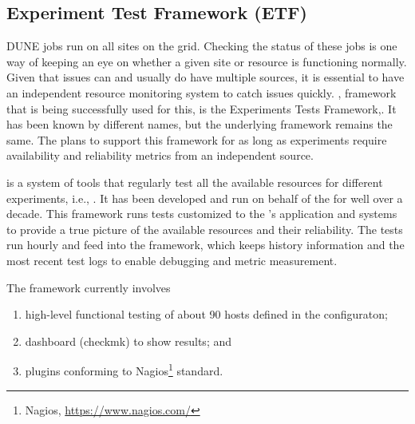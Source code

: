 \documentclass[../main-v1.tex]{subfiles}
\begin{document}
\subsection{Experiment Test Framework (ETF)}

DUNE jobs  run on all sites on the grid. Checking the status of these jobs is one way of keeping an eye on whether a given site or resource is functioning normally. Given that issues can and usually do have multiple sources, it is essential to have an independent resource monitoring system to %
catch issues quickly. %
, framework that is being successfully used for this, is the  %
 Experiments Tests Framework\cite{bib:ETFDoc},\cite{bib:ETFStatus}. It  has been known by different names, but the underlying framework remains the same. The  plans to support this framework for as long as  experiments require availability and reliability metrics from an independent source.
 
 is a system of tools that regularly test all the available resources for different experiments, i.e., . It has been developed and run on behalf of the  %
  for well over a decade. %
This framework runs tests customized to the 's application and systems to provide a true picture of the  available resources and their reliability. The  tests run hourly and feed into the  
framework, which keeps history information and the most recent test logs to enable debugging and metric measurement.

The  framework currently involves 
\begin{enumerate}
\item high-level functional testing of about 90 hosts defined in the  configuraton;
\item dashboard (checkmk) to show results; and
\item plugins conforming to Nagios\footnote{Nagios\textregistered, \url{https://www.nagios.com/}} standard. 
\end{enumerate}
\end{document}
